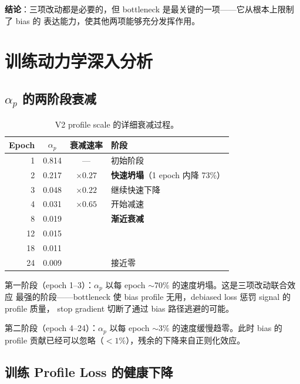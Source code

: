 \documentclass[11pt,a4paper]{ctexart}
\begin{document}
\textbf{结论}：三项改动都是必要的，但 bottleneck 是最关键的一项——它从根本上限制了 bias 的
表达能力，使其他两项能够充分发挥作用。

\section{训练动力学深入分析}

\subsection{$\alpha_p$ 的两阶段衰减}

\begin{table}[H]
\centering
\small
\caption{V2 profile scale 的详细衰减过程。}
\begin{tabular}{rccl}
\toprule
Epoch & $\alpha_p$ & 衰减速率 & 阶段 \\
\midrule
1 & 0.814 & --- & 初始阶段 \\
2 & 0.217 & $\times 0.27$ & \textbf{快速坍塌}（1 epoch 内降 73\%） \\
3 & 0.048 & $\times 0.22$ & 继续快速下降 \\
4 & 0.031 & $\times 0.65$ & 开始减速 \\
8 & 0.019 & & \textbf{渐近衰减} \\
12 & 0.015 & & \\
18 & 0.011 & & \\
24 & 0.009 & & 接近零 \\
\bottomrule
\end{tabular}
\end{table}

第一阶段（epoch 1--3）：$\alpha_p$ 以每 epoch $\sim$70\% 的速度坍塌。这是三项改动联合效应
最强的阶段——bottleneck 使 bias profile 无用，debiased loss 惩罚 signal 的 profile 质量，
stop gradient 切断了通过 bias 路径逃避的可能。

第二阶段（epoch 4--24）：$\alpha_p$ 以每 epoch $\sim$3\% 的速度缓慢趋零。此时 bias 的
profile 贡献已经可以忽略（$< 1\%$），残余的下降来自正则化效应。

\subsection{训练 Profile Loss 的健康下降}
\end{document}
